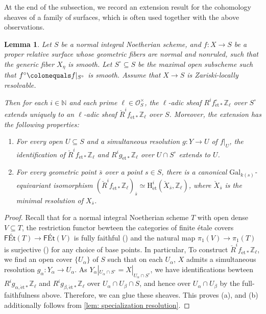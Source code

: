 \documentclass[11pt, letterpaper]{amsart}
\theoremstyle{plain}
\newtheorem{lemma}[theorem]{Lemma}
\theoremstyle{definition}
\newcommand{\IN}{\mathbb{N}}
\newcommand{\IZ}{\mathbb{Z}}
\newcommand{\<}{\langle}
\renewcommand{\>}{\rangle}
\newcommand{\sO}{\mathcal{O}}
\newcommand{\Gal}{\mathrm{Gal}}
\newcommand{\et}{\mathrm{{\acute{e}}t}}
\renewcommand{\H}{\mathrm{H}}
\begin{document}
At the end of the subsection, we record an extension result for the cohomology sheaves of a family of surfaces, which is often used together with the above observations.
\begin{lemma}
\label{lem: coh of Zariski-resolvable}
    Let $S$ be a normal integral Noetherian scheme, and $f : X \to S$ be a proper relative surface whose geometric fibers are normal and nonruled, such that the generic fiber $X_\eta$ is smooth. 
    Let $S^\circ \subseteq S$ be the maximal open subscheme such that $f^\circ \colonequals f|_{S^\circ}$ is smooth. 
    Assume that $X \to S$ is Zariski-locally resolvable.

    Then for each $i \in \IN$ and each prime $\ell\in \sO_S^\times$, the $\ell$-adic sheaf $R^i f^\circ_{\et *} \IZ_\ell$ over $S^\circ$ extends uniquely to an $\ell$-adic sheaf $\breve{R}^i f_{\et *} \IZ_\ell$ over $S$.
    Moreover, the extension has the following properties: 
    \begin{enumerate}[label=\upshape{(\alph*)}]
        \item For every open $U \subseteq S$ and a simultaneous resolution $g : Y \to U$ of $f|_U$, the identification of $\breve{R}^i f_{\et *} \IZ_\ell$ and $R^i g_{\et *} \IZ_\ell$ over $U \cap S^\circ$ extends to $U$. 
        \item For every geometric point $\bar{s}$ over a point $s \in S$, there is a canonical $\Gal_{k(s)}$-equivariant isomorphism $(\breve{R}^i f_{\et *} \IZ_\ell)_{\bar{s}} \simeq \H^i_\et(\breve{X}_{\bar{s}}, \IZ_\ell)$, where $\breve{X}_{\overline{s}}$ is the minimal resolution of $X_{\overline{s}}$. 
    \end{enumerate}
\end{lemma}
\begin{proof}
    Recall that for a normal integral Noetherian scheme $T$ with open dense $V \subseteq T$, the restriction functor bewteen the categories of finite \'etale covers $\textsf{F{\'E}t}(T) \to \textsf{F{\'E}t}(V)$ is fully faithful (\cite[\href{https://stacks.math.columbia.edu/tag/0BQI}{Tag 0BQI}, \href{https://stacks.math.columbia.edu/tag/0BQ3}{Tag 0BQ3}]{stacks-project}) and the natural map $\pi_1(V)\to \pi_1(T)$ is surjective (\cite[\href{https://stacks.math.columbia.edu/tag/0BN6}{Tag 0BN6}]{stacks-project}) for any choice of base points. 
    In particular, To construct $\breve{R}^i f_{\et *} \IZ_\ell$, we find an open cover $\{ U_\alpha \}$ of $S$ such that on each $U_\alpha$, $X$ admits a simultaneous resolution $g_\alpha : Y_\alpha \to U_\alpha$. 
    As $Y_\alpha |_{U_\alpha \cap S^\circ} = X|_{U_\alpha \cap S^\circ}$, we have identifications bewteen $R^i g_{\alpha, \et *} \IZ_\ell$ and $R^i g_{\beta, \et*} \IZ_\ell$ over $U_\alpha \cap U_\beta \cap S$, and hence over $U_\alpha \cap U_\beta$ by the full-faithfulness above. 
    Therefore, we can glue these sheaves. 
    This proves (a), and (b) additionally follows from \cref{lem: specialization resolution}. 
\end{proof}
  
\end{document}

